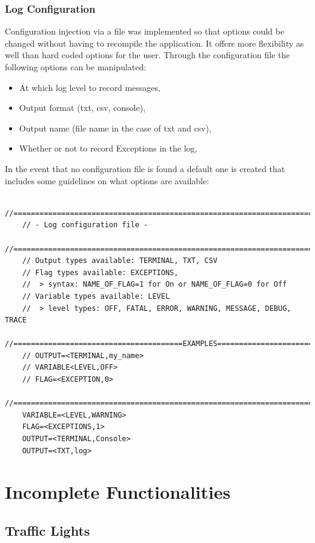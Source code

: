 \subsubsection{Log Configuration}

Configuration injection via a file was implemented so that options could be changed without having to recompile the application. It offers more flexibility as well than hard coded options for the user. Through the configuration file the following options can be manipulated:

\begin{itemize}
   	\item At which log level to record messages,
   	\item Output format (txt, csv, console),
   	\item Output name (file name in the case of txt and csv),
   	\item Whether or not to record Exceptions in the log,
\end{itemize}

In the event that no configuration file is found a default one is created that includes some guidelines on what options are available:

\begin{lstlisting}
	//======================================================================================
	// - Log configuration file - 
	//======================================================================================
	// Output types available: TERMINAL, TXT, CSV
	// Flag types available: EXCEPTIONS,
	// 	> syntax: NAME_OF_FLAG=1 for On or NAME_OF_FLAG=0 for Off
	// Variable types available: LEVEL
	// 	> level types: OFF, FATAL, ERROR, WARNING, MESSAGE, DEBUG, TRACE
	//=======================================EXAMPLES=======================================
	// OUTPUT=<TERMINAL,my_name>
	// VARIABLE<LEVEL,OFF>
	// FLAG=<EXCEPTION,0>
	//======================================================================================
	VARIABLE=<LEVEL,WARNING>
	FLAG=<EXCEPTIONS,1>
	OUTPUT=<TERMINAL,Console>
	OUTPUT=<TXT,log>
\end{lstlisting}


\section{Incomplete Functionalities}

\subsection{Traffic Lights}


